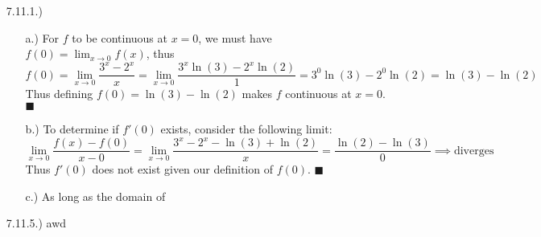\documentclass[11pt]{article}
\newcommand{\lm}[1]{\displaystyle\lim_{#1}}
\begin{document}
\pagestyle{fancy}
\fancyhead{}

\normalsize

\begin{itemize}
    \item [7.11.1.)] \begin{itemize}
        \item [a.)] For $f$ to be continuous at $x=0$, we must have $f(0)=\lm{x\to0}f(x)$, thus
        \[f(0)=\lm{x\to0}\frac{3^x-2^x}{x}=\lm{x\to0}\frac{3^x\ln(3)-2^x\ln(2)}{1}=3^0\ln(3)-2^0\ln(2)=\ln(3)-\ln(2)\]
        Thus defining $f(0)=\ln(3)-\ln(2)$ makes $f$ continuous at $x=0$. $\blacksquare$

        \item [b.)] To determine if $f'(0)$ exists, consider the following limit:
        \[\lm{x\to0}\frac{f(x)-f(0)}{x-0}=\lm{x\to0}\frac{3^x-2^x-\ln(3)+\ln(2)}{x}=\frac{\ln(2)-\ln(3)}{0}\implies\text{diverges}\]
        Thus $f'(0)$ does not exist given our definition of $f(0)$. $\blacksquare$

        \item [c.)] As long as the domain of 
    \end{itemize}

    \item [7.11.5.)] awd
\end{itemize}
\end{document}
